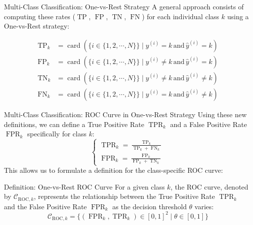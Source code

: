 \begin{frame}{Multi-Class Classification: One-vs-Rest Strategy}
	A general approach consists of computing these rates ($\operatorname{TP}$, $\operatorname{FP}$, $\operatorname{TN}$, $\operatorname{FN}$) for each individual class $k$ using a One-vs-Rest strategy:
	
	\begin{equation}
		\begin{aligned}
			\operatorname{TP}_k &= \operatorname{card} \left( \{i \in \{1, 2, \cdots, N\}\} \mid y^{(i)} = k \, \text{and} \, \hat{y}^{(i)} = k \right) \\
			\operatorname{FP}_k &= \operatorname{card} \left( \{i \in \{1, 2, \cdots, N\}\} \mid y^{(i)} \ne k \, \text{and} \, \hat{y}^{(i)} = k \right) \\
			\operatorname{TN}_k &= \operatorname{card} \left( \{i \in \{1, 2, \cdots, N\}\} \mid y^{(i)} \ne k \, \text{and} \, \hat{y}^{(i)} \ne k \right) \\
			\operatorname{FN}_k &= \operatorname{card} \left( \{i \in \{1, 2, \cdots, N\}\} \mid y^{(i)} = k \, \text{and} \, \hat{y}^{(i)} \ne k \right)
		\end{aligned}
		\nonumber
	\end{equation}
	
\end{frame}

\begin{frame}{Multi-Class Classification: ROC Curve in One-vs-Rest Strategy}
	Using these new definitions, we can define a True Positive Rate $\operatorname{TPR}_k$ and a False Positive Rate $\operatorname{FPR}_k$ specifically for class $k$:
	\begin{equation}
		\begin{cases}
			\operatorname{TPR}_k = \displaystyle \frac{\operatorname{TP}_k}{\operatorname{TP}_k + \operatorname{FN}_k} \\[10pt]
			\operatorname{FPR}_k = \displaystyle \frac{\operatorname{FP}_k}{\operatorname{FP}_k + \operatorname{TN}_k}
		\end{cases}
		\nonumber
	\end{equation}
	\pause
	This allows us to formulate a definition for the class-specific ROC curve:
	\begin{block}{Definition: One-vs-Rest ROC Curve}
		For a given class $k$, the ROC curve, denoted by $\mathcal{C}_{\text{ROC},k}$, represents the relationship between the True Positive Rate $\operatorname{TPR}_k$ and the False Positive Rate $\operatorname{FPR}_k$ as the decision threshold $\theta$ varies:
		\begin{equation}
			\mathcal{C}_{\text{ROC},k} = \{ \left(\operatorname{FPR}_k, \operatorname{TPR}_k\right) \in [0, 1]^2 \mid \theta \in [0, 1]\}
			\nonumber
		\end{equation}
	\end{block}
\end{frame}

